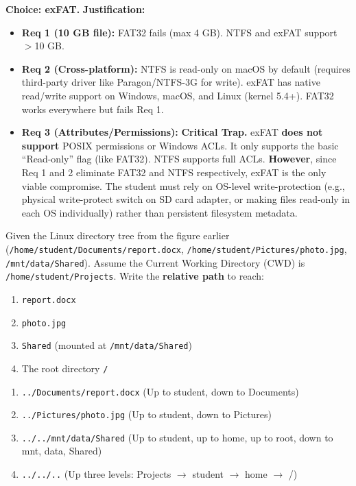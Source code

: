 \documentclass[11pt]{article}
\begin{document}
\begin{corrige}[Exercise 2]
\textbf{Choice: exFAT.}
\textbf{Justification:}
\begin{itemize}
    \item \textbf{Req 1 (10 GB file):} FAT32 fails (max 4 GB). NTFS and exFAT support $>$10 GB.
    \item \textbf{Req 2 (Cross-platform):} NTFS is read-only on macOS by default (requires third-party driver like Paragon/NTFS-3G for write). exFAT has native read/write support on Windows, macOS, and Linux (kernel 5.4+). FAT32 works everywhere but fails Req 1.
    \item \textbf{Req 3 (Attributes/Permissions):} \textbf{Critical Trap.} exFAT \textbf{does not support} POSIX permissions or Windows ACLs. It only supports the basic ``Read-only'' flag (like FAT32). NTFS supports full ACLs. \textbf{However}, since Req 1 and 2 eliminate FAT32 and NTFS respectively, exFAT is the only viable compromise. The student must rely on OS-level write-protection (e.g., physical write-protect switch on SD card adapter, or making files read-only in each OS individually) rather than persistent filesystem metadata.
\end{itemize}
\end{corrige}

\begin{exercice}
Given the Linux directory tree from the figure earlier (\texttt{/home/student/Documents/report.docx}, \texttt{/home/student/Pictures/photo.jpg}, \texttt{/mnt/data/Shared}).
Assume the Current Working Directory (CWD) is \texttt{/home/student/Projects}.
Write the \textbf{relative path} to reach:
\begin{enumerate}
    \item \texttt{report.docx}
    \item \texttt{photo.jpg}
    \item \texttt{Shared} (mounted at \texttt{/mnt/data/Shared})
    \item The root directory \texttt{/}
\end{enumerate}
\end{exercice}


\begin{corrige}[Exercise 3]
\begin{enumerate}
    \item \texttt{../Documents/report.docx} (Up to student, down to Documents)
    \item \texttt{../Pictures/photo.jpg} (Up to student, down to Pictures)
    \item \texttt{../../mnt/data/Shared} (Up to student, up to home, up to root, down to mnt, data, Shared)
    \item \texttt{../../..} (Up three levels: Projects $\rightarrow$ student $\rightarrow$ home $\rightarrow$ /)
\end{enumerate}
\end{corrige}
\end{document}

